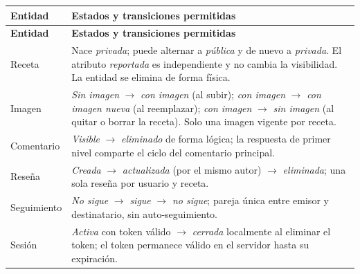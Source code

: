\documentclass[doc,12pt,a4paper]{apa7}
\begin{document}
\begin{longtable}{|P{3.4cm}|L{10.6cm}|}
\hline
\textbf{Entidad} & \textbf{Estados y transiciones permitidas} \\ \hline
\endfirsthead
\hline
\textbf{Entidad} & \textbf{Estados y transiciones permitidas} \\ \hline
\endhead
\hline
\endfoot

Receta & Nace \textit{privada}; puede alternar a \textit{pública} y de nuevo a \textit{privada}. El atributo \textit{reportada} es independiente y no cambia la visibilidad. La entidad se elimina de forma física. \\ \hline

Imagen & \textit{Sin imagen} $\rightarrow$ \textit{con imagen} (al subir); \textit{con imagen} $\rightarrow$ \textit{con imagen nueva} (al reemplazar); \textit{con imagen} $\rightarrow$ \textit{sin imagen} (al quitar o borrar la receta). Solo una imagen vigente por receta. \\ \hline

Comentario & \textit{Visible} $\rightarrow$ \textit{eliminado} de forma lógica; la respuesta de primer nivel comparte el ciclo del comentario principal. \\ \hline

Reseña & \textit{Creada} $\rightarrow$ \textit{actualizada} (por el mismo autor) $\rightarrow$ \textit{eliminada}; una sola reseña por usuario y receta. \\ \hline

Seguimiento & \textit{No sigue} $\rightarrow$ \textit{sigue} $\rightarrow$ \textit{no sigue}; pareja única entre emisor y destinatario, sin auto-seguimiento. \\ \hline

Sesión & \textit{Activa} con token válido $\rightarrow$ \textit{cerrada} localmente al eliminar el token; el token permanece válido en el servidor hasta su expiración. \\ \hline

\end{longtable}
\end{document}
